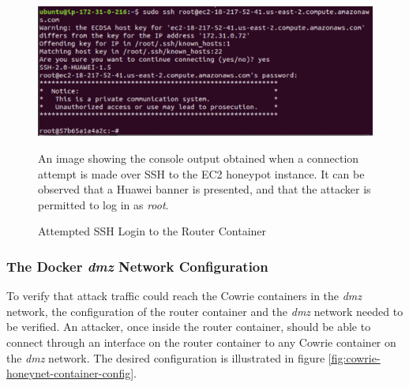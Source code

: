 \begin{figure}[ht]
      \centering
      \includegraphics[width=160mm, scale=1]{Images/ssh_to_router_successful.PNG}
      \caption{Attempted SSH Login to the Router Container} 
      \medskip
      \small
		An image showing the console output obtained when a connection attempt is made over SSH to the EC2 honeypot instance. It can be observed that a Huawei banner is presented, and that the attacker is permitted to log in as \textit{root}. 
\label{fig:ssh-to-router-successful}
\end{figure}





\subsubsection{The Docker \textit{dmz} Network Configuration}
To verify that attack traffic could reach the Cowrie containers in the \textit{dmz} network,  the configuration of the router container and the \textit{dmz} network needed to be verified. An attacker, once inside the router container, should be able to connect through an interface on the router container to any Cowrie container on the \textit{dmz} network. The desired configuration is illustrated  in figure \ref{fig:cowrie-honeynet-container-config}.

